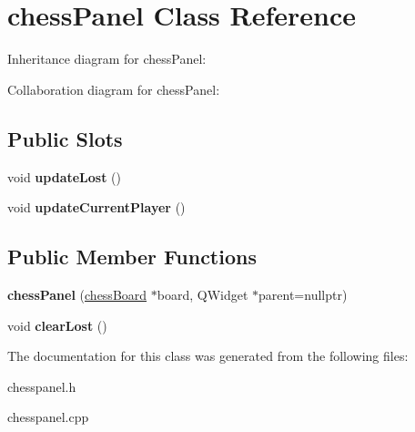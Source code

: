 \hypertarget{classchessPanel}{}\section{chess\+Panel Class Reference}
\label{classchessPanel}


Inheritance diagram for chess\+Panel\+:


Collaboration diagram for chess\+Panel\+:
\subsection*{Public Slots}
\begin{DoxyCompactItemize}
\item 
\mbox{\label{classchessPanel_adeab3d504a94b4380487c3a04a10441e}} 
void {\bfseries update\+Lost} ()
\item 
\mbox{\label{classchessPanel_a65f79990c4a6fdd8b26c469d605d44e8}} 
void {\bfseries update\+Current\+Player} ()
\end{DoxyCompactItemize}
\subsection*{Public Member Functions}
\begin{DoxyCompactItemize}
\item 
\mbox{\label{classchessPanel_aaba2c97d187804e244977d982c71a79f}} 
{\bfseries chess\+Panel} (\hyperlink{classchessBoard}{chess\+Board} $\ast$board, Q\+Widget $\ast$parent=nullptr)
\item 
\mbox{\label{classchessPanel_a5fb61b2212fc50934fb84865774a1708}} 
void {\bfseries clear\+Lost} ()
\end{DoxyCompactItemize}


The documentation for this class was generated from the following files\+:\begin{DoxyCompactItemize}
\item 
chesspanel.\+h\item 
chesspanel.\+cpp\end{DoxyCompactItemize}
